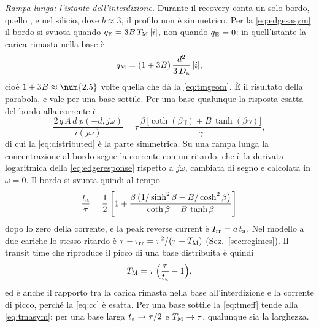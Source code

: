 \documentclass[10pt,a4paper]{scrartcl}
\let\newcommand\pdvaluedefine
\newcommand{\Irr}{I_\mathrm{rr}}
\newcommand{\ta}{t_\mathrm{a}}
\newcommand{\taurr}{\tau_\mathrm{rr}}
\newcommand{\TM}{T_\mathrm{M}}
\newcommand{\qE}{q_\mathrm{E}}
\newcommand{\qM}{q_\mathrm{M}}
\newcommand{\Da}{D_\mathrm{a}}
\newcommand{\Pp}{p\textsuperscript{+}}
\begin{document}
\emph{Rampa lunga: l'istante dell'interdizione.} Durante il recovery conta un solo bordo, quello \Pp, e nel silicio, dove $b \approx 3$, il profilo non è simmetrico. Per la \eqref{eq:edgesasym} il bordo \Pp{} si svuota quando $\qE = 3B\,\TM\,|i|$, non quando $\qE = 0$: in quell'istante la carica rimasta nella base è
\begin{equation}
\qM = (1 + 3B)\,\frac{d^2}{3\,\Da}\,|i| ,
\label{eq:tmasym}
\end{equation}
cioè $1 + 3B \approx \num{\pdTmAsymFactor}$ volte quella che dà la \eqref{eq:tmgeom}. È il risultato della parabola, e vale per una base sottile. Per una base qualunque la risposta esatta del bordo \Pp{} alla corrente è
\begin{equation}
\frac{2\,q\,A\,d\;p(-d,j\omega)}{i(j\omega)} = \tau\,\frac{\beta\,\bigl[\coth(\beta\gamma) + B\,\tanh(\beta\gamma)\bigr]}{\gamma} ,
\label{eq:edgeresponse}
\end{equation}
di cui la \eqref{eq:distributed} è la parte simmetrica. Su una rampa lunga la concentrazione al bordo segue la corrente con un ritardo, che è la derivata logaritmica della \eqref{eq:edgeresponse} rispetto a $j\omega$, cambiata di segno e calcolata in $\omega = 0$. Il bordo si svuota quindi al tempo
\begin{equation}
\frac{\ta}{\tau} = \frac12\left[1 + \frac{\beta\,\bigl(1/\sinh^2\beta - B/\cosh^2\beta\bigr)}{\coth\beta + B\,\tanh\beta}\right]
\label{eq:tadist}
\end{equation}
dopo lo zero della corrente, e la peak reverse current è $\Irr = a\,\ta$. Nel modello a due cariche lo stesso ritardo è $\tau - \taurr = \tau^2/(\tau+\TM)$ (Sez.~\ref{sec:regimes}). Il transit time che riproduce il picco di una base distribuita è quindi
\begin{equation}
\TM = \tau\,\Bigl(\frac{\tau}{\ta} - 1\Bigr) ,
\label{eq:tmeff}
\end{equation}
ed è anche il rapporto tra la carica rimasta nella base all'interdizione e la corrente di picco, perché la \eqref{eq:cc} è esatta. Per una base sottile la \eqref{eq:tmeff} tende alla \eqref{eq:tmasym}; per una base larga $\ta \to \tau/2$ e $\TM \to \tau$, qualunque sia la larghezza.
\end{document}
